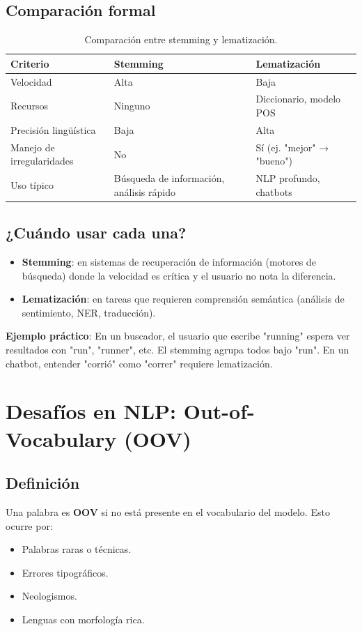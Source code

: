 \documentclass[12pt,a4paper,openany,oneside]{book}
\begin{document}
\subsection{Comparación formal}
\begin{table}[h]
\centering
\begin{tabular}{|l|l|l|}
\hline
\textbf{Criterio} & \textbf{Stemming} & \textbf{Lematización} \\
\hline
Velocidad & Alta & Baja \\
Recursos & Ninguno & Diccionario, modelo POS \\
Precisión lingüística & Baja & Alta \\
Manejo de irregularidades & No & Sí (ej. "mejor" → "bueno") \\
Uso típico & Búsqueda de información, análisis rápido & NLP profundo, chatbots \\
\hline
\end{tabular}
\caption{Comparación entre stemming y lematización.}
\end{table}

\subsection{¿Cuándo usar cada una?}
\begin{itemize}
    \item \textbf{Stemming}: en sistemas de recuperación de información (motores de búsqueda) donde la velocidad es crítica y el usuario no nota la diferencia.
    \item \textbf{Lematización}: en tareas que requieren comprensión semántica (análisis de sentimiento, NER, traducción).
\end{itemize}

\textbf{Ejemplo práctico}: En un buscador, el usuario que escribe "running" espera ver resultados con "run", "runner", etc. El stemming agrupa todos bajo "run". En un chatbot, entender "corrió" como "correr" requiere lematización.

\section{Desafíos en NLP: Out-of-Vocabulary (OOV)}

\subsection{Definición}
Una palabra es \textbf{OOV} si no está presente en el vocabulario del modelo. Esto ocurre por:
\begin{itemize}
    \item Palabras raras o técnicas.
    \item Errores tipográficos.
    \item Neologismos.
    \item Lenguas con morfología rica.
\end{itemize}
\end{document}
